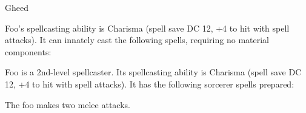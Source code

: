 \documentclass[10pt,twoside,twocolumn,openany]{dndbook}
\begin{document}
\begin{DndMonster}[float*=b,width=\textwidth + 8pt]{Gheed}
    \begin{multicols}{2}

    \DndMonsterBasics[
        armor-class = {9 (12 with \emph{mage armor})},
        hit-points  = {\DndDice{3d8 + 3}},
        speed       = {30 ft., fly 30 ft.},
      ]

    \DndMonsterAbilityScores[
        str = 12,
        dex = 8,
        con = 13,
        int = 10,
        wis = 14,
        cha = 15,
      ]

    \DndMonsterDetails[
        senses = {visión en la oscuridad 60 pies, percepción pasiva 10},
        languages = {común, goblin},
        challenge = 3,
      ]
    Foo's spellcasting ability is Charisma (spell save DC 12, +4 to hit with spell attacks). It can innately cast the following spells, requiring no material components:
    \begin{DndMonsterSpells}
    \end{DndMonsterSpells}

    Foo is a 2nd-level spellcaster. Its spellcasting ability is Charisma (spell save DC 12, +4 to hit with spell attacks). It has the following sorcerer spells prepared:
    \begin{DndMonsterSpells}
    \end{DndMonsterSpells}

    The foo makes two melee attacks.


\end{multicols}
\end{DndMonster}
\end{document}
